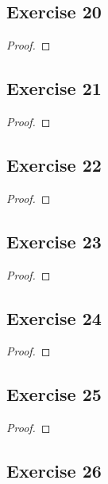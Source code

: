\documentclass[14pt]{extarticle}
\begin{document}
\subsection{Exercise 20}

\begin{proof}

\end{proof}

\subsection{Exercise 21}

\begin{proof}

\end{proof}

\subsection{Exercise 22}

\begin{proof}

\end{proof}

\subsection{Exercise 23}

\begin{proof}

\end{proof}

\subsection{Exercise 24}

\begin{proof}

\end{proof}

\subsection{Exercise 25}

\begin{proof}

\end{proof}

\subsection{Exercise 26}
\end{document}
